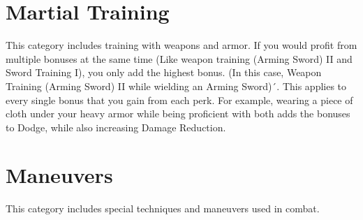 \chapter{Martial Training}\label{ch:martialTraining}
This category includes training with weapons and armor.
If you would profit from multiple bonuses at the same time (Like weapon training (Arming Sword) II and Sword Training I), you only add the highest bonus.
(In this case, Weapon Training (Arming Sword) II while wielding an Arming Sword)´.
This applies to every single bonus that you gain from each perk.
For example, wearing a piece of cloth under your heavy armor while being proficient with both adds the bonuses to Dodge, while also increasing Damage Reduction.

	

	

	

	
	
	

	

	

	

	

	

	

	

	

	

	

\chapter{Maneuvers}\label{ch:maneuvers}
This category includes special techniques and maneuvers used in combat.

	

	

	

	
	
	

	

	
	
	